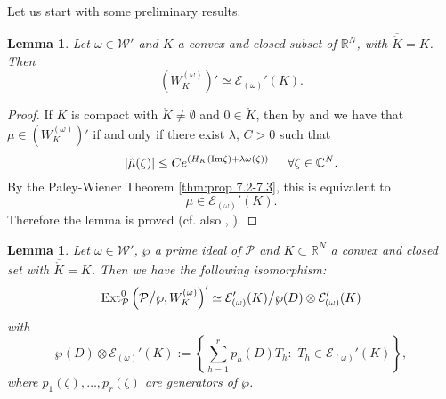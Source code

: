 \documentclass[twoside]{amsart}
\newtheorem{Lemma}[Th]{Lemma}
\begin{document}
Let us start with some preliminary results.

\begin{Lemma}
\label{lem:Lemma1}
Let $\omega\in{\mathcal{W}}'$ and $K$ a convex and closed subset of ${\mathbb R}^N$,
with $\overline{\mathring{K}}=K$. Then
\[
\left(W_{K}^{(\omega)}\right)'\simeq{\mathcal{E}}_{(\omega)}'(K).
\]
\end{Lemma}

\begin{proof}
If $K$ is compact with $\mathring{K}\not=\emptyset$ and $0\in\mathring{K}$,
then by \cite[Cor. 4.7]{BBMT} and \cite[Prop. 3.6]{MT}
we have that $\mu\in\left(W_{K}^{(\omega)}\right)'$ if and only if
there exist $\lambda,\,C>0$ such that
\begin{equation}
|\hat{\mu}(\zeta)|\leq Ce^{\left(H_{K}({\mathop{\rm Im}\nolimits}\zeta)+\lambda\omega(\zeta)\right)}
\,\,\,\,\,\,\,\,\,\forall\zeta\in\mathbb{C}^{N}.
\label{eq:stella-1}
\end{equation}
By the Paley-Wiener Theorem \ref{thm:prop 7.2-7.3}, this is equivalent
to
\[
\mu\in{\mathcal{E}}_{(\omega)}'(K).
\]
Therefore the lemma is proved 
(cf. also \cite{M}, \cite{N1}).
\end{proof}

\begin{Lemma}
\label{lem:lemma2}
Let $\omega\in{\mathcal{W}}'$, $\wp$ a prime ideal of $\mathcal P$ and
$K\subset{\mathbb R}^N$ a convex and closed set with 
$\overline{\mathring{K}}=K$. Then
we have the following isomorphism: 
\begin{equation}
{\mathop{\rm Ext}\nolimits}_{{\mathcal P}}^{0}\left({\mathcal P}\bigl/\wp,W_{K}^{(\omega)}\right)'
\simeq{\mathcal{E}}_{(\omega)}'(K)\bigl/\wp(D)\otimes{\mathcal{E}}_{(\omega)}'(K)
\label{eq:ISOMORFISMO}
\end{equation}
with 
\[
\wp(D)\otimes{\mathcal{E}}_{(\omega)}'(K):=\left\{\sum_{h=1}^{r}p_{h}(D)T_{h}:\,\,
T_{h}\in{\mathcal{E}}_{(\omega)}'(K)\right\} ,
\]
where $p_{1}(\zeta),\ldots,p_{r}(\zeta)$ are generators of $\wp$.
\end{Lemma}
\end{document}
